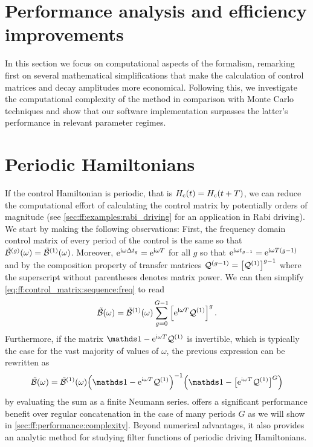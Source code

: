 \section{Performance analysis and efficiency improvements}\label{sec:ff:performance}
In this section we focus on computational aspects of the formalism, remarking first on several mathematical simplifications that make the calculation of control matrices and decay amplitudes more economical.
Following this, we investigate the computational complexity of the method in comparison with Monte Carlo techniques and show that our software implementation surpasses the latter's performance in relevant parameter regimes.

\section{Periodic Hamiltonians}\label{sec:ff:performance:periodic_hamiltonians}
If the control Hamiltonian is periodic, that is $H_{\mathrm{c}}(t) = H_{\mathrm{c}}(t + T)$, we can reduce the computational effort of calculating the control matrix by potentially orders of magnitude (see \cref{sec:ff:examples:rabi_driving} for an application in Rabi driving).
We start by making the following observations: First, the frequency domain control matrix of every period of the control is the same so that $\tilde{\mathcal{B}}^{(g)}(\omega) = \tilde{\mathcal{B}}^{(1)}(\omega)$.
Moreover, $\mathrm{e}^{\mathrm{i}\omega\Delta t_g} = \mathrm{e}^{\mathrm{i}\omega T}$ for all $g$ so that $\mathrm{e}^{\mathrm{i}\omega t_{g-1}} = \mathrm{e}^{\mathrm{i}\omega T(g - 1)}$ and by the composition property of transfer matrices $\mathcal{Q}^{(g-1)} = \left[\mathcal{Q}^{(1)}\right]^{g-1}$ where the superscript without parentheses denotes matrix power.
We can then simplify \cref{eq:ff:control_matrix:sequence:freq} to read
\begin{equation}\label{eq:ff:control_matrix:sequence:periodic:explicit}
    \tilde{\mathcal{B}}(\omega) = \tilde{\mathcal{B}}^{(1)}(\omega)\sum_{g=0}^{G-1}\left[\mathrm{e}^{\mathrm{i}\omega T}\mathcal{Q}^{(1)}\right]^g.
\end{equation}
Furthermore, if the matrix $\eye - \e^{\i\omega T}\liouvQ\gth{1}$ is invertible, which is typically the case for the vast majority of values of $\omega$, the previous expression can be rewritten as
\begin{equation}\label{eq:ff:control_matrix:sequence:periodic:simplified}
    \ctrlmat(\omega) = \ctrlmat\gth{1}(\omega)\Bigl(\eye - \e^{\i\omega T}\liouvQ\gth{1}\Bigr)^{-1}
        \Bigl(\eye - \bigl[\e^{\i\omega T}\liouvQ\gth{1}\bigr]^G\Bigr)
\end{equation}
by evaluating the sum as a finite Neumann series.
 offers a significant performance benefit over regular concatenation in the case of many periods $G$ as we will show in \cref{sec:ff:performance:complexity}.
Beyond numerical advantages, it also provides an analytic method for studying filter functions of periodic driving Hamiltonians.

